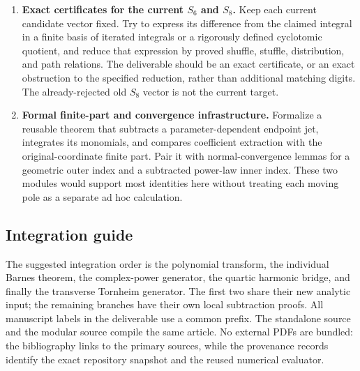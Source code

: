 \documentclass[11pt]{article}
\numberwithin{equation}{section}
\theoremstyle{plain}
\theoremstyle{definition}
\theoremstyle{remark}
\begin{document}
\begin{enumerate}[label=\textbf{F\arabic*.},leftmargin=*,itemsep=9pt]
 \item \textbf{Exact certificates for the current $S_6$ and $S_8$.}
 Keep each current candidate vector fixed. Try to express its
 difference from the claimed integral in a finite basis of
 iterated integrals or a rigorously defined cyclotomic quotient,
 and reduce that expression by proved shuffle, stuffle,
 distribution, and path relations. The deliverable should be
 an exact certificate, or an exact obstruction to the specified
 reduction, rather than additional matching digits. The
 already-rejected old $S_8$ vector is not the current target.

 \item \textbf{Formal finite-part and convergence infrastructure.}
 Formalize a reusable theorem that subtracts a parameter-dependent
 endpoint jet, integrates its monomials, and compares coefficient
 extraction with the original-coordinate finite part. Pair it
 with normal-convergence lemmas for a geometric outer index and
 a subtracted power-law inner index. These two modules would
 support most identities here without treating each moving pole
 as a separate ad hoc calculation.
\end{enumerate}

\subsection{Integration guide}

The suggested integration order is the polynomial transform,
the individual Barnes theorem, the complex-power generator,
the quartic harmonic bridge, and finally the transverse Tornheim
generator. The first two share their new analytic input;
the remaining branches have their own local subtraction proofs.
All manuscript labels in the deliverable use a common prefix.
The standalone source and the modular source compile the same
article. No external PDFs are bundled: the bibliography links to
the primary sources, while the provenance records identify the
exact repository snapshot and the reused numerical evaluator.

\end{document}

